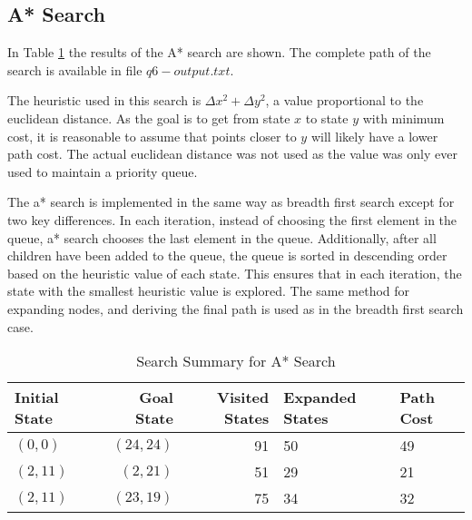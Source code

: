 \documentclass{article}
\begin{document}
\subsection{A* Search}
    In Table \ref{tab:a*6} the results of the A* search are shown. The complete path of the search is available in file $q6-output.txt$.
    \setlength{\parskip}{6pt}

    The heuristic used in this search is $\Delta x^2 + \Delta y^2$, a value proportional to the euclidean distance. As the goal is to get from state $x$ to state $y$ with minimum cost, it is reasonable to assume that points closer to $y$ will likely have a lower path cost. The actual euclidean distance was not used as the value was only ever used to maintain a priority queue.
    \setlength{\parskip}{6pt}
    
    The a* search is implemented in the same way as breadth first search except for two key differences. In each iteration, instead of choosing the first element in the queue, a* search chooses the last element in the queue. Additionally, after all children have been added to the queue, the queue is sorted in descending order based on the heuristic value of each state. This ensures that in each iteration, the state with the smallest heuristic value is explored. The same method for expanding nodes, and deriving the final path is used as in the breadth first search case.
    \begin{table}[!htp]\centering
        \caption{Search Summary for A* Search}\label{tab:a*6}
        \scriptsize
        \begin{tabular}{lrrll}\toprule
        Initial State &Goal State &Visited States&Expanded States&Path Cost  \\\midrule
        $(0,0)$ & $(24,24)$ & 91 & 50 & 49 \\
        $(2, 11)$ & $(2, 21)$ & 51 & 29 & 21 \\
        $(2, 11)$ & $(23, 19)$ & 75 & 34 & 32 \\
    \end{tabular}
    \end{table}
\end{document}
